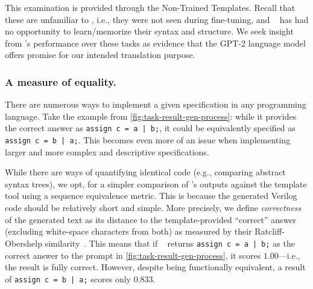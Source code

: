 This examination is provided through the Non-Trained Templates. 
Recall that these are unfamiliar to \sol, i.e., they were not seen during fine-tuning,
and \sol~ has had no opportunity to learn/memorize their syntax and structure.
%
We seek insight from \sol's performance over these tasks as evidence that the GPT-2 language model offers promise for our intended translation purpose.
%




\subsubsection{A measure of equality.} 
\label{sec:equality}
There are numerous ways to implement a given specification in any programming language. 
Take the example from \autoref{fig:task-result-gen-process}: while it provides the correct answer as \texttt{assign c = a~|~b;}, it could be equivalently specified as \texttt{assign c = b | a;}.
This becomes even more of an issue when implementing larger and more complex and descriptive specifications.

While there are ways of quantifying identical code (e.g., comparing abstract syntax trees), we opt, for a simpler comparison of \sol's outputs against the template tool using a sequence equivalence metric. This is because the generated Verilog code should be relatively short and simple.
More precisely, we define \textit{correctness} of the generated text as its distance to the template-provided ``correct'' answer (excluding white-space characters from both) as measured by their Ratcliff-Obershelp similarity~\cite{ratcliff1998ratcliff}.
This means that if \sol~ returns \texttt{assign c = a | b;} as the correct answer to the prompt in \autoref{fig:task-result-gen-process}, it scores $1.00$---i.e., the result is fully correct.
However, despite being functionally equivalent, a result of \texttt{assign c = b | a;} scores only $0.833$.

